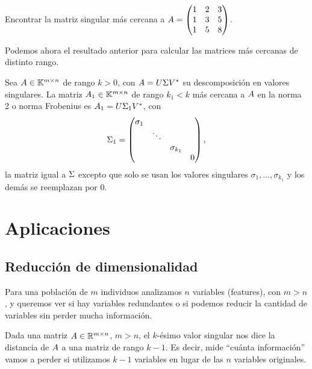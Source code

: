 \begin{ejercicio}
Encontrar la matriz singular más cercana a $\Ab = \begin{pmatrix} 1 & 2 & 3 \\ 1 & 3 & 5 \\ 1 & 5 & 8\end{pmatrix}$.
\end{ejercicio}

Podemos ahora el resultado anterior para calcular las matrices más cercanas de distinto rango.

\begin{teorema}
Sea $\Ab \in \K^{m \times n}$ de rango $k > 0$, con $\Ab = \Ub \Sigmab \Vb^*$ su descomposición en valores singulares. La matriz $\Ab_1 \in \K^{m \times n}$ de rango $k_1 < k$ más cercana a $\Ab$ en la norma 2 o norma Frobenius es $\Ab_1 = \Ub \Sigmab_{1} \Vb^*$, con
$$\Sigmab_{1} =
\begin{pmatrix}
\sigma_1 & & & \\
 & \ddots & & \\
 & & \sigma_{k_1} & \\
 & &  & 0
\end{pmatrix},
$$
la matriz igual a $\Sigmab$ excepto que solo se usan los valores singulares $\sigma_1, \dots, \sigma_{k_1}$ y los demás se reemplazan por 0.
\end{teorema}


\section{Aplicaciones}

\subsection{Reducción de dimensionalidad}

Para una población de $m$ individuos analizamos $n$ variables (features), con $m > n$, y queremos ver si hay variables redundantes o si podemos reducir la cantidad de variables sin perder mucha información.

Dada una matriz $\Ab \in \R^{m \times n}$, $m > n$, el $k$-\'esimo valor singular nos dice la distancia de $\Ab$ a una matriz de rango $k-1$.
Es decir, mide ``cuánta información'' vamos a perder si utilizamos $k-1$ variables en lugar de las $n$ variables originales.

